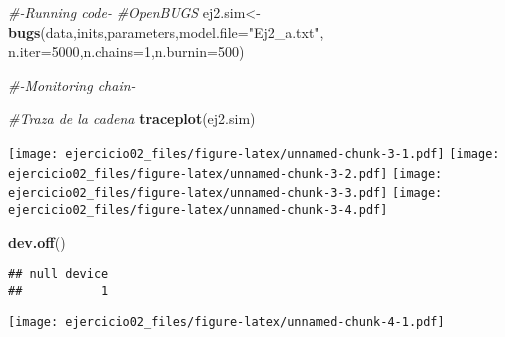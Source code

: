 \documentclass[]{article}
\newenvironment{Shaded}{\begin{snugshade}}{\end{snugshade}}
\newcommand{\KeywordTok}[1]{\textcolor[rgb]{0.13,0.29,0.53}{\textbf{{#1}}}}
\newcommand{\DataTypeTok}[1]{\textcolor[rgb]{0.13,0.29,0.53}{{#1}}}
\newcommand{\DecValTok}[1]{\textcolor[rgb]{0.00,0.00,0.81}{{#1}}}
\newcommand{\StringTok}[1]{\textcolor[rgb]{0.31,0.60,0.02}{{#1}}}
\newcommand{\CommentTok}[1]{\textcolor[rgb]{0.56,0.35,0.01}{\textit{{#1}}}}
\newcommand{\OtherTok}[1]{\textcolor[rgb]{0.56,0.35,0.01}{{#1}}}
\newcommand{\NormalTok}[1]{{#1}}
\begin{document}
\begin{Shaded}
\begin{Highlighting}[]
\CommentTok{#-Running code-}
\CommentTok{#OpenBUGS}
\NormalTok{ej2.sim<-}\KeywordTok{bugs}\NormalTok{(data,inits,parameters,}\DataTypeTok{model.file=}\StringTok{"Ej2_a.txt"}\NormalTok{,           }\DataTypeTok{n.iter=}\DecValTok{5000}\NormalTok{,}\DataTypeTok{n.chains=}\DecValTok{1}\NormalTok{,}\DataTypeTok{n.burnin=}\DecValTok{500}\NormalTok{)}

\CommentTok{#-Monitoring chain-}

\CommentTok{#Traza de la cadena}
\KeywordTok{traceplot}\NormalTok{(ej2.sim)}
\end{Highlighting}
\end{Shaded}

\texttt{[image: ejercicio02\_files/figure-latex/unnamed-chunk-3-1.pdf]}
\texttt{[image: ejercicio02\_files/figure-latex/unnamed-chunk-3-2.pdf]}
\texttt{[image: ejercicio02\_files/figure-latex/unnamed-chunk-3-3.pdf]}
\texttt{[image: ejercicio02\_files/figure-latex/unnamed-chunk-3-4.pdf]}

\begin{Shaded}
\begin{Highlighting}[]
\KeywordTok{dev.off}\NormalTok{()}
\end{Highlighting}
\end{Shaded}

\begin{verbatim}
## null device 
##           1
\end{verbatim}

\begin{Shaded}
\end{Shaded}

\texttt{[image: ejercicio02\_files/figure-latex/unnamed-chunk-4-1.pdf]}
\end{document}
